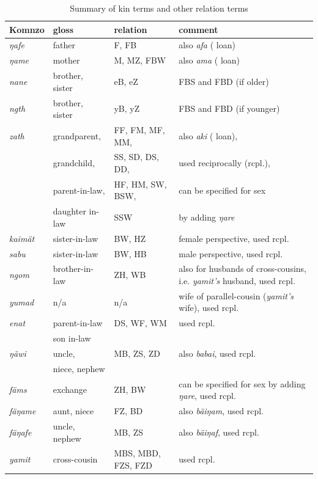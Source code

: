 \renewcommand{\tabcolsep}{2,3pt}
\begin{table}
\caption{Summary of kin terms and other relation terms}
\label{kintermstable}
	\begin{tabularx}{\textwidth}{llp{3cm}Q}
		\lsptoprule
			{Komnzo} & {gloss}&{relation} & comment\\\midrule
			\emph{ŋafe} & father & F, FB & also \emph{afa} ( loan)\\
			\emph{ŋame} & mother & M, MZ, FBW & also \emph{ama} ( loan)\\
			\emph{nane} & brother, sister & eB, eZ & FBS and FBD (if older)\\
			\emph{ngth} & brother, sister & yB, yZ & FBS and FBD (if younger)\\
			\emph{zath} & grandparent,&FF, FM, MF, MM, & also \emph{aki} ( loan),\\
			&grandchild,&SS, SD, DS, DD, &used reciprocally (rcpl.), \\
			&parent-in-law,&HF, HM, SW, BSW, &can be specified for sex\\
			&daughter in-law&SSW &by adding \emph{ŋare}\\
			\emph{kaimät} & sister-in-law & BW, HZ & female perspective, used rcpl.\\
			\emph{sabu} & sister-in-law & BW, HB & male perspective, used rcpl.\\
			\emph{ngom} & brother-in-law & ZH, WB & also for husbands of cross-cousins, i.e. \emph{yamit's} husband, used rcpl.\\
			\emph{yumad} & n/a & n/a & wife of parallel-cousin (\emph{yamit's} wife), used rcpl.\\
			\emph{enat} &parent-in-law& DS, WF, WM&used rcpl.\\
			&son in-law&&\\
			\emph{ŋäwi} & uncle,& MB, ZS, ZD	& also \emph{babai}, used rcpl.\\
			&niece, nephew&&\\
			\emph{fäms} & exchange	& ZH, BW & can be specified for sex by adding \emph{ŋare}, used rcpl.\\
			\emph{fäŋame} & aunt, niece & FZ, BD&also \emph{bäiŋam}, used rcpl.\\
			\emph{fäŋafe} & uncle, nephew & MB, ZS&also \emph{bäiŋaf}, used rcpl.\\
			\emph{yamit} & cross-cousin & MBS, MBD, FZS, FZD & used rcpl.\\

\end{tabularx}
\end{table}

